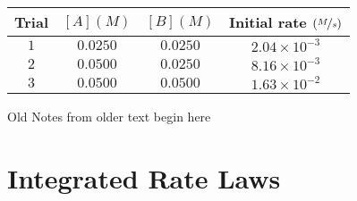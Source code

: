 \documentclass[12pt, openany, letterpaper]{memoir}
\begin{document}
\begin{itemize}
	
	\begin{tabular}{c|c|c|c}
		Trial & $\left[A\right](M)$ & $\left[B\right](M)$ & Initial rate $\left(\nicefrac{M}{s}\right)$ \\ \midrule
		$1$ & $0.0250$ & $0.0250$ & $2.04\times10^{-3}$ \\
		$2$ & $0.0500$ & $0.0250$ & $8.16\times10^{-3}$ \\
		$3$ & $0.0500$ & $0.0500$ & $1.63\times10^{-2}$ \\
	\end{tabular}
\end{itemize}

{\HUGE Old Notes from older text begin here}

\section{Integrated Rate Laws}
\end{document}
